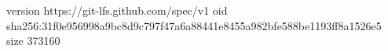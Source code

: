 version https://git-lfs.github.com/spec/v1
oid sha256:31f0e956998a9bc8d9c797f47a6a88441e8455a982bfe588be1193ff8a1526e5
size 373160
